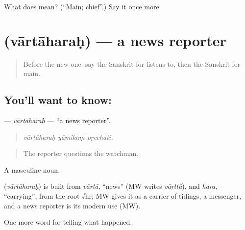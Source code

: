 \begin{tcolorbox}[breakable,colback=teal!4,colframe=teal!35!black,title={Before you move on}]
What does  mean? (\textquotedblleft{}Main; chief\textquotedblright{}.) Say it once more.
\end{tcolorbox}
\section[\texorpdfstring{\sk{वार्ताहरः} (vārtāharaḥ)}{वार्ताहरः (vārtāharaḥ)}]{ (vārtāharaḥ) — a news reporter}

\label{lesson:SA-C309-vartaharah}



\begin{quote}
Before the new one: say the Sanskrit for listens to, then the Sanskrit for main.
\end{quote}

\subsection*{You'll want to know: }
\textbf{} — \emph{vārtāharaḥ} — \textquotedblleft{}a news reporter\textquotedblright{}.

\begin{quote}
  
\end{quote}

\begin{quote}
\emph{vārtāharaḥ yāmikaṃ pṛcchati.}
\end{quote}

\begin{quote}
The reporter questions the watchman.
\end{quote}

A masculine noun.

\begin{cousinweb}
\textbf{} (\emph{vārtāharaḥ}) is built from \emph{vārtā}, \textquotedblleft{}news\textquotedblright{} (MW writes \emph{vārttā}), and \emph{hara}, \textquotedblleft{}carrying\textquotedblright{}, from the root √hṛ; MW gives it as a carrier of tidings, a messenger, and a news reporter is its modern use (MW).
\end{cousinweb}

\begin{grammarlens}[title={What you've built}]
One more word for telling what happened.
\end{grammarlens}

